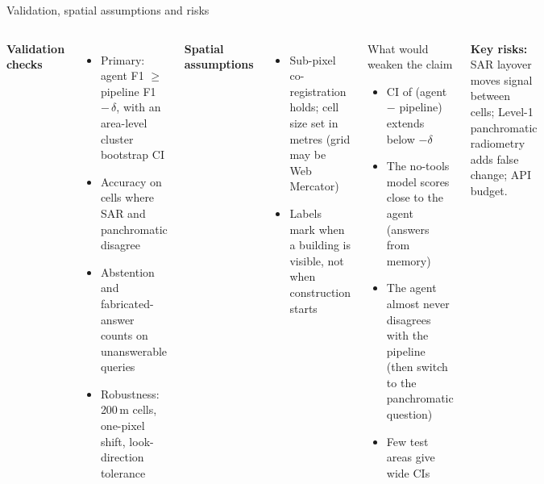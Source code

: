 \documentclass[aspectratio=169,11pt]{beamer}
\begin{document}
\begin{frame}[shrink=16]{Validation, spatial assumptions and risks}
\begin{columns}[T,onlytextwidth]
\textbf{Validation checks}
\begin{itemize}\small
  \item Primary: agent F1 $\geq$ pipeline F1 $-\,\delta$, with an area-level cluster bootstrap CI
  \item Accuracy on cells where SAR and panchromatic disagree
  \item Abstention and fabricated-answer counts on unanswerable queries
  \item Robustness: 200\,m cells, one-pixel shift, look-direction tolerance
\end{itemize}
\textbf{Spatial assumptions}
\begin{itemize}\small
  \item Sub-pixel co-registration holds; cell size set in metres (grid may be Web Mercator)
  \item Labels mark when a building is visible, not when construction starts
\end{itemize}
\begin{block}{What would weaken the claim}
\small
\begin{itemize}
  \item CI of (agent $-$ pipeline) extends below $-\delta$
  \item The no-tools model scores close to the agent (answers from memory)
  \item The agent almost never disagrees with the pipeline (then switch to the panchromatic question)
  \item Few test areas give wide CIs
\end{itemize}
\end{block}
\textbf{Key risks:} SAR layover moves signal between cells; Level-1 panchromatic radiometry adds false change; API budget.
\end{columns}
\end{frame}
\end{document}
